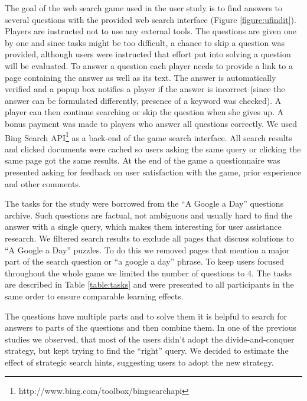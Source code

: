 \documentclass{sig-alternate}
\begin{document}
The goal of the web search game used in the user study is to find answers to several questions with the provided web search interface (Figure \ref{figure:ufindit}). 
Players are instructed not to use any external tools.
The questions are given one by one and since tasks might be too difficult, a chance to skip a question was provided, although users were instructed that effort put into solving a question will be evaluated.
To answer a question each player needs to provide a link to a page containing the answer as well as its text.
The answer is automatically verified and a popup box notifies a player if the answer is incorrect (since the answer can be formulated differently, presence of a keyword was checked).
A player can then continue searching or skip the question when she gives up.
A bonus payment was made to players who answer all questions correctly.
We used Bing Search API\footnote{http://www.bing.com/toolbox/bingsearchapi} as a back-end of the game search interface.
All search results and clicked documents were cached so users asking the same query or clicking the same page got the same results.
At the end of the game a questionnaire was presented asking for feedback on user satisfaction with the game, prior experience and other comments.

The tasks for the study were borrowed from the ``A Google a Day'' questions archive.
Such questions are factual, not ambiguous and usually hard to find the answer with a single query, which makes them interesting for user assistance research.
We filtered search results to exclude all pages that discuss solutions to ``A Google a Day'' puzzles.
To do this we removed pages that mention a major part of the search question or ``a google a day'' phrase.
To keep users focused throughout the whole game we limited the number of questions to 4.
The tasks are described in Table \ref{table:tasks} and were presented to all participants in the same order to ensure comparable learning effects.

The questions have multiple parts and to solve them it is helpful to search for answers to parts of the questions and then combine them.
In one of the previous studies we observed, that most of the users didn't adopt the divide-and-conquer strategy, but kept trying to find the ``right'' query.
We decided to estimate the effect of strategic search hints, suggesting users to adopt the new strategy.
\end{document}
